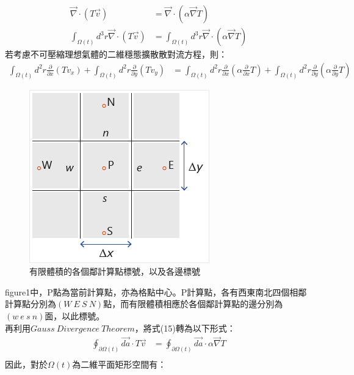 \documentclass[12pt]{article}
\begin{document}
\begin{align}
  \vec{\nabla}\cdot (T \vec{v}) &= \vec{\nabla} \cdot \left(\alpha \vec{\nabla} T\right)\\
  \int_{\Omega(t)} d^{3} r \vec{\nabla}\cdot (T \vec{v}) &=  \int_{\Omega(t)} d^{3} r \vec{\nabla} \cdot \left( \alpha \vec{\nabla} T\right)
\end{align}
\noindent 若考慮不可壓縮理想氣體的二維穩態擴散散對流方程，則：
\begin{align}
  \int_{\Omega(t)} d^{2} r \frac{\partial}{\partial x} (T v_x)+\int_{\Omega(t)} d^{2} r \frac{\partial}{\partial y} (T v_y) &=  \int_{\Omega(t)} d^{2} r \frac{\partial}{\partial x}  \left( \alpha \frac{\partial}{\partial x}  T\right)+\int_{\Omega(t)} d^{2} r \frac{\partial}{\partial y} \left( \alpha \frac{\partial}{\partial y}  T\right)
\end{align}
\begin{figure}[H]%
    \centering
    \includegraphics[scale=0.5]{2.png}
    \caption{有限體積的各個鄰計算點標號，以及各邊標號}
    \label{fig:1}
\end{figure}
\noindent figure1中，P點為當前計算點，亦為格點中心。P計算點，各有西東南北四個相鄰計算點分別為$(W\ E\ S\ N)$點，而有限體積相應於各個鄰計算點的邊分別為$(w\ e\ s\ n)$面，以此標號。\\
\newpage
\noindent 再利用$Gauss\ Divergence\ Theorem$，將式(15)轉為以下形式：\\
\begin{equation}
  \begin{split}
      \oint_{\partial \Omega(t)} \vec{da} \cdot T \vec{v} &=  \oint_{\partial \Omega(t)} \vec{da} \cdot  \alpha \vec{\nabla} T\\
  \end{split}
\end{equation}
\noindent 因此，對於$\Omega(t)$為二維平面矩形空間有：
\end{document}

